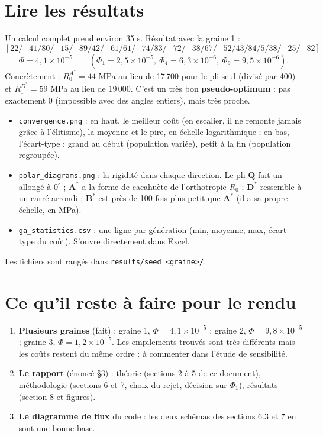 \documentclass[11pt,a4paper]{article}
\newcommand{\As}{\mathbf{A}^{*}}
\newcommand{\Bs}{\mathbf{B}^{*}}
\newcommand{\Ds}{\mathbf{D}^{*}}
\newcommand{\Q}{\mathbf{Q}}
\newcommand{\code}[1]{\texttt{#1}}
\begin{document}
\section{Lire les résultats}
Un calcul complet prend environ 35 s. Résultat avec la graine 1 :
\[
[22/{-41}/80/{-15}/{-89}/42/{-61}/61/{-74}/83/{-72}/{-38}/67/{-52}/43/84/5/38/{-25}/{-82}]
\]
\[
\Phi = 4{,}1\times10^{-5}
\qquad(\Phi_1 = 2{,}5\times10^{-5},\ \Phi_4 = 6{,}3\times10^{-6},\ \Phi_9 = 9{,}5\times10^{-6}).
\]
Concrètement : $R_0^{A^*} = 44$ MPa au lieu de 17\,700 pour le pli seul
(divisé par 400) et $R_1^{D^*} = 59$ MPa au lieu de 19\,000. C'est un très
bon \textbf{pseudo-optimum} : pas exactement 0 (impossible avec des angles
entiers), mais très proche.

\begin{itemize}
  \item \code{convergence.png} : en haut, le meilleur coût (en escalier, il ne
        remonte jamais grâce à l'élitisme), la moyenne et le pire, en échelle
        logarithmique ; en bas, l'écart-type : grand au début (population
        variée), petit à la fin (population regroupée).
  \item \code{polar\_diagrams.png} : la rigidité dans chaque direction. Le pli
        $\Q$ fait un \fg{} allongé à $0^\circ$ ; $\As$ a la forme de
        cacahuète de l'orthotropie $R_0$ ; $\Ds$ ressemble à un carré arrondi
        ; $\Bs$ est près de 100 fois plus petit que $\As$ (il a sa propre
        échelle, en MPa).
  \item \code{ga\_statistics.csv} : une ligne par génération (min, moyenne,
        max, écart-type du coût). S'ouvre directement dans Excel.
\end{itemize}
Les fichiers sont rangés dans \code{results/seed\_<graine>/}.

\section{Ce qu'il reste à faire pour le rendu}
\begin{enumerate}
  \item \textbf{Plusieurs graines} (fait) : graine 1, $\Phi = 4{,}1\times10^{-5}$ ;
        graine 2, $\Phi = 9{,}8\times10^{-5}$ ; graine 3,
        $\Phi = 1{,}2\times10^{-5}$. Les empilements trouvés sont très
        différents mais les coûts restent du même ordre : à commenter dans
        l'étude de sensibilité.
  \item \textbf{Le rapport} (énoncé §3) : théorie (sections 2 à 5 de ce
        document), méthodologie (sections 6 et 7, choix du rejet, décision
        sur $\Phi_1$), résultats (section 8 et figures).
  \item \textbf{Le diagramme de flux} du code : les deux schémas des
        sections 6.3 et 7 en sont une bonne base.
\end{enumerate}
\end{document}
